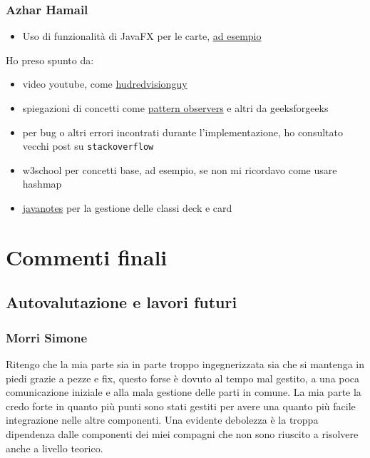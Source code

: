 \documentclass[a4paper,12pt]{report}
\begin{document}
\subsection{Azhar Hamail}
\begin{itemize}
    \item Uso di funzionalità di JavaFX per le carte, \href{https://github.com/MoneIsProgrammer/OOP25_risiko/blob/master/src/main/java/it/unibo/risiko/view/cards/CardView.java}{ad esempio}
\end{itemize}
Ho preso spunto da:
\begin{itemize}
    \item video youtube, come \href{https://youtube.com/playlist?list=PLlmV8hCw8wblhfOeesNFABDq4gQHc2CL_&si=R5UHVmDRaBtifulw}{hudredvisionguy}
    \item spiegazioni di concetti come \href{https://www.geeksforgeeks.org/system-design/observer-pattern-set-1-introduction/}{pattern observers} e altri da geeksforgeeks
    \item per bug o altri errori incontrati durante l'implementazione, ho consultato vecchi post su \texttt{stackoverflow}
    \item w3school per concetti base, ad esempio, se non mi ricordavo come usare hashmap
    \item \href{https://math.hws.edu/javanotes/source/}{javanotes} per la gestione delle classi deck e card
\end{itemize}

%
%
%

\chapter{Commenti finali}

\section{Autovalutazione e lavori futuri}
\subsection{Morri Simone}
Ritengo che la mia parte sia in parte troppo ingegnerizzata sia che si mantenga in piedi grazie a pezze e fix, questo forse è dovuto al tempo mal gestito, a una poca comunicazione iniziale e alla mala gestione delle parti in comune. La mia parte la credo forte in quanto più punti sono stati gestiti per avere una quanto più facile integrazione nelle altre componenti. Una evidente debolezza è la troppa dipendenza dalle componenti dei miei compagni che non sono riuscito a risolvere anche a livello teorico.
\end{document}

